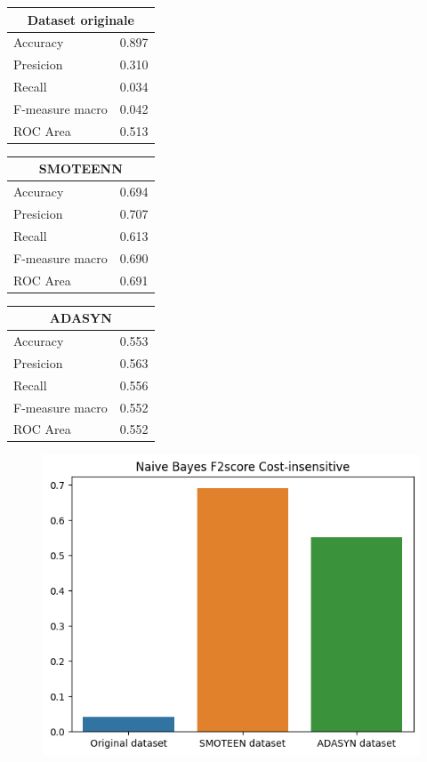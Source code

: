 \documentclass[italian,12pt,a4paper]{article}
\begin{document}
	
	\begin{center}
		
		\begin{table}[h]
			\footnotesize
			\begin{tabular}{|p{2cm}|c|}
				\hline
				\multicolumn{2}{|c|}{Dataset originale}\\ \hline
				Accuracy & 0.897 \\ \hline
				Presicion & 0.310 \\ \hline
				Recall & 0.034 \\ \hline
				F-measure macro & 0.042 \\ \hline
				ROC Area & 0.513 \\ \hline  
			\end{tabular}
			\hfill
			\begin{tabular}{|p{2cm}|c|}
				\hline
				\multicolumn{2}{|c|}{SMOTEENN}\\ \hline
				Accuracy & 0.694 \\ \hline
				Presicion & 0.707 \\ \hline
				Recall & 0.613 \\ \hline
				F-measure macro & 0.690 \\ \hline
				ROC Area & 0.691 \\ \hline  
			\end{tabular}
			\hfill
			\begin{tabular}{|p{2cm}|r|} \hline
				\multicolumn{2}{|c|}{ADASYN}\\ \hline
				Accuracy & 0.553 \\ \hline
				Presicion & 0.563 \\ \hline
				Recall & 0.556 \\ \hline
				F-measure macro & 0.552 \\ \hline
				ROC Area & 0.552 \\ \hline  
			\end{tabular}
		\end{table} 
		\begin{figure}[h]
			\centering
			\includegraphics[scale=0.73]{Bayes}
		\end{figure}
	\end{center}
	
\end{document}
